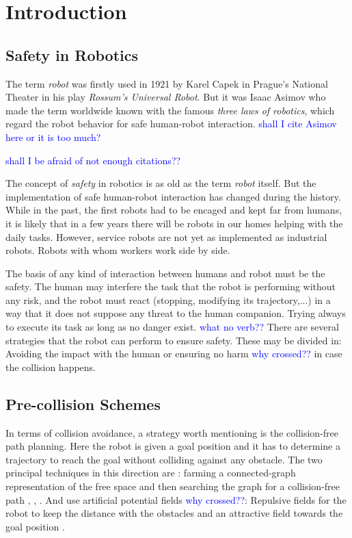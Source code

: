 \chapter{Introduction}
\label{ch:Introduction}





\section{Safety in Robotics}

The term \textit{robot} was firstly used in 1921 by Karel Capek in Prague's National Theater in his play \textit{Rossum's Universal Robot}. But it was Isaac Asimov who made the term worldwide known with the famous \textit{three laws of robotics}, which regard the robot behavior for safe human-robot interaction. \textcolor{blue}{shall I cite Asimov here or it is too much?}

\textcolor{blue}{shall I be afraid of not enough citations??}

The concept of \textit{safety} in robotics is as old as the term \textit{robot} itself. But the implementation of safe human-robot interaction  has changed during the history. While in the past, the first robots had to be encaged and kept far from humans, it is likely that in a few years there will be robots in our homes helping with the daily tasks. However, service robots are not yet as implemented as industrial robots. Robots with whom workers work side by side.

The basis of any kind of interaction between humans and robot must be the safety. The human may interfere the task that the robot is performing without any risk, and the robot must react (stopping, modifying its trajectory,...) in a way that it does not suppose any threat to the human companion. Trying always to execute its task as long as no danger exist.  \textcolor{blue}{what no verb??}
There are several strategies that the robot can perform to ensure safety. These may be divided in: Avoiding the impact with the human or ensuring no harm \textcolor{blue}{why crossed??} in case the collision happens.

\section{Pre-collision Schemes}
\label{sec:pre_collision}


In terms of collision avoidance, a strategy worth mentioning is the collision-free path planning. Here the robot is given a goal position and it has to determine a trajectory to reach the goal without colliding against any obstacle. The two principal techniques  in this direction are \cite{Craig:1989:IRM:534661}: farming a connected-graph representation of the free space and then searching the graph for a collision-free path \cite{Bobrow}, \cite{Shin}, \cite{Lozano}. And use artificial potential fields \textcolor{blue}{why crossed??}: Repulsive fields for the robot to keep the distance with the obstacles and an attractive field towards the goal position \cite{Khatib1}.

